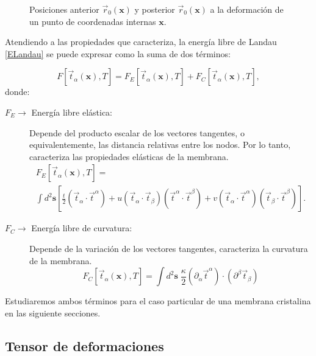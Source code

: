 \begin{figure}[h]
\centering
 
\caption{Posiciones anterior $\vec{r}_0(\mathbf{x})$ y posterior
  $\vec{r}_0(\mathbf{x})$ a la deformación de un punto de coordenadas internas
$\mathbf{x}$.}\label{Deformacion-fig}
\end{figure}

Atendiendo a las propiedades que caracteriza, la energía libre de Landau
\eqref{ELandau} se puede expresar como la suma de dos términos:

\begin{equation*}
 F[\vec{t}_{\alpha}(\mathbf{x}),T]= F_E[\vec{t}_{\alpha}(\mathbf{x}),T]+F_C[\vec{t}_{\alpha}(\mathbf{x}),T],
\end{equation*}
donde:
\begin{description}
\item[ $F_E\rightarrow $ Energía libre elástica:] Depende del producto escalar
  de los vectores tangentes, o equivalentemente, las distancia relativas entre
  los nodos. Por lo tanto, caracteriza las propiedades elásticas de la membrana.
  \begin{multline}\label{ELandau_elastica}
    F_E[\vec{t}_{\alpha}(\mathbf{x}),T]=\\\int d^2\mathbf{s}
    \left[
      \frac{t}{2}(\vec{t}_{\alpha}\cdot\vec{t}^{\alpha})+
      u(\vec{t}_{\alpha}\cdot\vec{t}_{\beta})(\vec{t}^{\alpha}\cdot\vec{t}^{\beta})+
      v(\vec{t}_{\alpha}\cdot\vec{t}^{\alpha})(\vec{t}_{\beta}\cdot\vec{t}^{\beta})\right].
  \end{multline}
\item[ $F_C\rightarrow $ Energía libre de curvatura:] Depende de la variación
  de los vectores tangentes, caracteriza la curvatura de la membrana. 
  \begin{equation}\label{ELandau_curvatura}
       F_C[\vec{t}_{\alpha}(\mathbf{x}),T]=\int d^2\mathbf{s}\; 
      \frac{\kappa}{2}(\partial_{\alpha}\vec{t}^{\alpha})\cdot(\partial^{\beta}\vec{t}_{\beta})
  \end{equation}
\end{description}

Estudiaremos ambos términos para el caso particular de una membrana cristalina 
en las siguiente secciones.

\subsection{Tensor de deformaciones}

